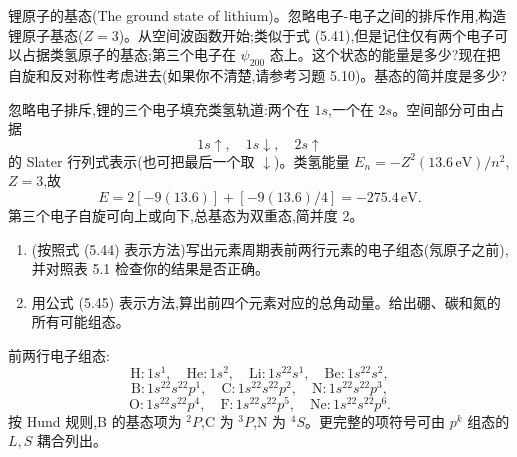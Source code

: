 \begin{question}
锂原子的基态(The ground state of lithium)。忽略电子-电子之间的排斥作用,构造锂原子基态($Z=3$)。从空间波函数开始;类似于式 (5.41),但是记住仅有两个电子可以占据类氢原子的基态;第三个电子在 $\psi_{200}$ 态上。这个状态的能量是多少?现在把自旋和反对称性考虑进去(如果你不清楚,请参考习题 5.10)。基态的简并度是多少?

\par\smallskip
{}

\begin{solution}

忽略电子排斥,锂的三个电子填充类氢轨道:两个在 $1s$,一个在 $2s$。空间部分可由占据
\[
1s\uparrow,
\quad 1s\downarrow,
\quad 2s\uparrow
\]
的 Slater 行列式表示(也可把最后一个取 $\downarrow$)。类氢能量 $E_n=-Z^2(13.6\,\mathrm{eV})/n^2$,$Z=3$,故
\[
E=2[-9(13.6)]+[-9(13.6)/4]
=-275.4\,\mathrm{eV}.
\]
第三个电子自旋可向上或向下,总基态为双重态,简并度 2。

\end{solution}
\end{question}

\begin{question}
\begin{enumerate}
\item (按照式 (5.44) 表示方法)写出元素周期表前两行元素的电子组态(氖原子之前),并对照表 5.1 检查你的结果是否正确。
\item 用公式 (5.45) 表示方法,算出前四个元素对应的总角动量。给出硼、碳和氮的所有可能组态。
\end{enumerate}

\par\smallskip
{}

\begin{solution}

前两行电子组态:
\[
\mathrm H:1s^1,
\quad \mathrm{He}:1s^2,
\quad \mathrm{Li}:1s^22s^1,
\quad \mathrm{Be}:1s^22s^2,
\]
\[
\mathrm B:1s^22s^22p^1,
\quad \mathrm C:1s^22s^22p^2,
\quad \mathrm N:1s^22s^22p^3,
\]
\[
\mathrm O:1s^22s^22p^4,
\quad \mathrm F:1s^22s^22p^5,
\quad \mathrm{Ne}:1s^22s^22p^6.
\]
按 Hund 规则,B 的基态项为 ${}^2P$,C 为 ${}^3P$,N 为 ${}^4S$。更完整的项符号可由 $p^k$ 组态的 $L,S$ 耦合列出。

\end{solution}
\end{question}

